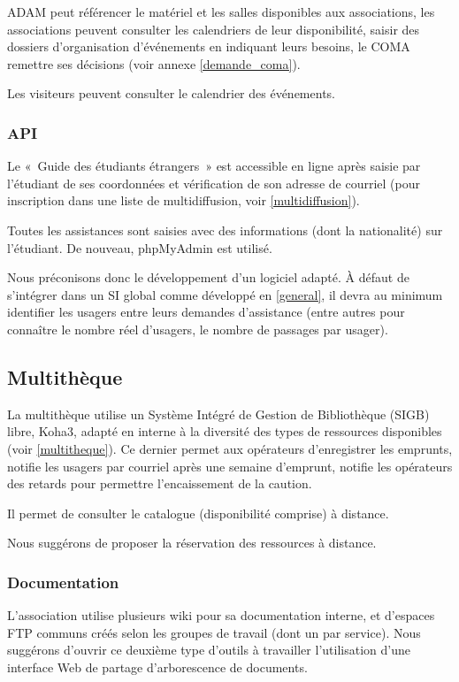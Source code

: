 ADAM peut référencer le matériel et les salles disponibles aux associations,
les associations peuvent consulter les calendriers de leur disponibilité,
saisir des dossiers d'organisation d'événements en indiquant leurs besoins,
le COMA remettre ses décisions (voir annexe \ref{demande_coma}).

Les visiteurs peuvent consulter le calendrier des événements.

\subsubsection{API}

Le «~Guide des étudiants étrangers~» est accessible en ligne après saisie par
l'étudiant de ses coordonnées et vérification de son adresse de courriel (pour
inscription dans une liste de multidiffusion, voir \ref{multidiffusion}).

Toutes les assistances sont saisies avec des informations (dont la nationalité)
sur l'étudiant. De nouveau, phpMyAdmin est utilisé.

Nous préconisons donc le développement d'un logiciel adapté. À défaut
de s'intégrer dans un SI global comme développé en \ref{general}, il
devra au minimum identifier les usagers entre leurs demandes d'assistance
(entre autres pour connaître le nombre réel d'usagers, le nombre de passages
par usager).

\subsection{Multithèque}

La multithèque utilise un Système Intégré de Gestion de Bibliothèque (SIGB) libre, Koha3,
adapté en interne à la diversité des types de ressources disponibles (voir \ref{multitheque}).
Ce dernier permet aux opérateurs d'enregistrer les emprunts, notifie les usagers
par courriel après une semaine d'emprunt, notifie les opérateurs des retards pour permettre l'encaissement de la caution.

Il permet de consulter le catalogue (disponibilité comprise) à distance.

Nous suggérons de proposer la réservation des ressources à distance.

\subsubsection{Documentation}

L'association utilise plusieurs wiki pour sa documentation interne, et d'espaces FTP
communs créés selon les groupes de travail (dont un par service). Nous suggérons d'ouvrir
ce deuxième type d'outils à travailler l'utilisation d'une interface Web de partage
d'arborescence de documents.